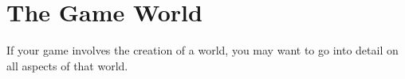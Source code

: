 \chapter{The Game World}
If your game involves the creation of a world, you may want to go into detail on
all aspects of that world.












